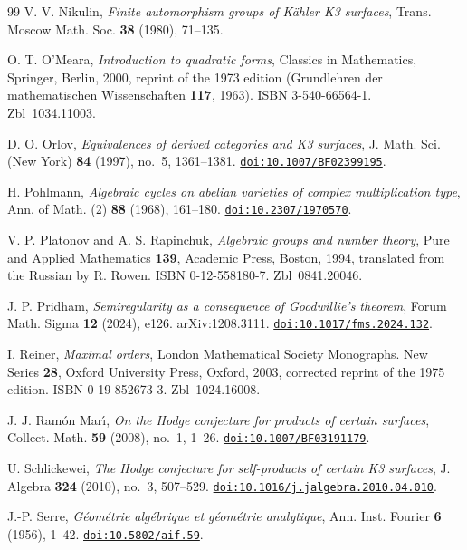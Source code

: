 \begin{thebibliography}{99}
V. V. Nikulin,
\emph{Finite automorphism groups of K\"ahler K3 surfaces},
Trans. Moscow Math. Soc. \textbf{38} (1980), 71--135.

O. T. O'Meara,
\emph{Introduction to quadratic forms},
Classics in Mathematics, Springer, Berlin, 2000, reprint of the 1973 edition (Grundlehren der mathematischen Wissenschaften \textbf{117}, 1963). ISBN 3-540-66564-1. Zbl~1034.11003.

D. O. Orlov,
\emph{Equivalences of derived categories and K3 surfaces},
J. Math. Sci. (New York) \textbf{84} (1997), no.~5, 1361--1381.
\href{https://doi.org/10.1007/BF02399195}{\nolinkurl{doi:10.1007/BF02399195}}.

H. Pohlmann,
\emph{Algebraic cycles on abelian varieties of complex multiplication type},
Ann. of Math. (2) \textbf{88} (1968), 161--180.
\href{https://doi.org/10.2307/1970570}{\nolinkurl{doi:10.2307/1970570}}.

V. P. Platonov and A. S. Rapinchuk,
\emph{Algebraic groups and number theory},
Pure and Applied Mathematics \textbf{139}, Academic Press, Boston, 1994, translated from the Russian by R. Rowen. ISBN 0-12-558180-7. Zbl~0841.20046.

J. P. Pridham,
\emph{Semiregularity as a consequence of Goodwillie's theorem},
Forum Math. Sigma \textbf{12} (2024), e126. arXiv:1208.3111.
\href{https://doi.org/10.1017/fms.2024.132}{\nolinkurl{doi:10.1017/fms.2024.132}}.

I. Reiner,
\emph{Maximal orders},
London Mathematical Society Monographs. New Series \textbf{28}, Oxford University Press, Oxford, 2003, corrected reprint of the 1975 edition. ISBN 0-19-852673-3. Zbl~1024.16008.

J. J. Ram\'on Mar\'{\i},
\emph{On the Hodge conjecture for products of certain surfaces},
Collect. Math. \textbf{59} (2008), no.~1, 1--26.
\href{https://doi.org/10.1007/BF03191179}{\nolinkurl{doi:10.1007/BF03191179}}.

U. Schlickewei,
\emph{The Hodge conjecture for self-products of certain K3 surfaces},
J. Algebra \textbf{324} (2010), no.~3, 507--529.
\href{https://doi.org/10.1016/j.jalgebra.2010.04.010}{\nolinkurl{doi:10.1016/j.jalgebra.2010.04.010}}.

J.-P. Serre,
\emph{G\'eom\'etrie alg\'ebrique et g\'eom\'etrie analytique},
Ann. Inst. Fourier \textbf{6} (1956), 1--42.
\href{https://doi.org/10.5802/aif.59}{\nolinkurl{doi:10.5802/aif.59}}.


\end{thebibliography}
